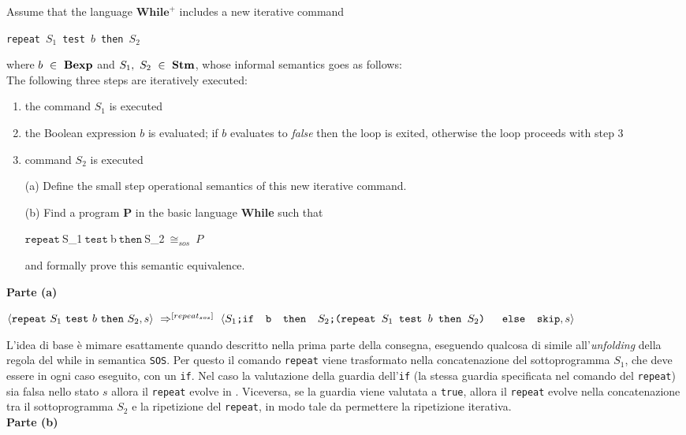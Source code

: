 \newcommand{\repeatSbS}[3]{\texttt{repeat}~#1~\texttt{test}~#2~\texttt{then}~#3}

{
	Assume that the language $\textbf{While}^{\textbf{+}}$ includes a new
	iterative command
	\begin{center}
	\repeatSbS{$S_1$}{$b$}{$S_2$}
	\end{center}
	where $b~\in~\mbox{\textbf{Bexp}}$ and $S_1,~S_2~\in~\mbox{\textbf{Stm}}$, whose informal semantics goes
	as follows:\\The following three steps are iteratively executed:
	\begin{enumerate}
	\item the command $S_1$ is executed
	\item the Boolean expression $b$ is evaluated; if $b$ evaluates to 
	\emph{false} then the loop is exited, otherwise the loop proceeds with step
	3
	\item command $S_2$ is executed
	\end{enumerate}
	\begin{itemize}
	\item [(a)] Define the small step operational semantics of this new
	iterative command.
	\item [(b)] Find a program \textbf{P} in the basic language \textbf{While} such that
	\begin{center}
	$\repeatSbS{$S_1$}{$b$}{$S_2$}~\cong_{sos}~P$
	\end{center}
	and formally prove this semantic equivalence.
	\end{itemize}
}
{
	\hspace*{\textwidth-}

	\textbf{Parte (a)}
	\begin{center}
	$\confSs{\repeatSbS{S_1}{b}{S_2}}{s}~\Rar{[repeat_{sos}]}~
	\confSs{\concat
	{$S_1$}
	{\ifABC{b}{\concat
	{$S_2$}
	{(\repeatSbS{$S_1$}{$b$}{$S_2$})}
	}{\skipistr}}
	}{s}$
	\end{center}
	L'idea di base è mimare esattamente quando descritto nella prima parte
	della consegna, eseguendo qualcosa di simile all'\emph{unfolding} della
	regola del while in semantica \texttt{SOS}. Per questo il comando
	\texttt{repeat} viene trasformato nella concatenazione del sottoprogramma
	$S_1$, che deve essere in ogni caso eseguito, con un \texttt{if}. Nel caso
	la valutazione della guardia dell'\texttt{if} (la stessa guardia
	specificata nel comando del \texttt{repeat}) sia falsa nello stato $s$
	allora il \texttt{repeat} evolve in \skipistr{}. Viceversa, se la guardia
	viene valutata a \texttt{true}, allora il \texttt{repeat} evolve nella
	concatenazione tra il sottoprogramma $S_2$ e la ripetizione del 
	\texttt{repeat}, in modo tale da permettere la ripetizione iterativa.\\

	\textbf{Parte (b)}
}